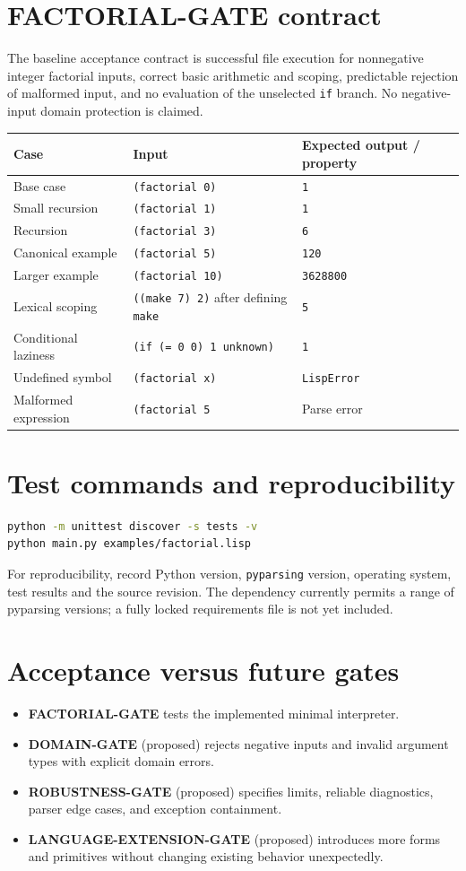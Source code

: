 \documentclass[11pt,a4paper,oneside]{report}
\begin{document}
\section{FACTORIAL-GATE contract}
The baseline acceptance contract is successful file execution for nonnegative integer factorial inputs, correct basic arithmetic and scoping, predictable rejection of malformed input, and no evaluation of the unselected \texttt{if} branch. No negative-input domain protection is claimed.
\begin{longtable}{p{}p{}p{}}\toprule Case & Input & Expected output / property\\\midrule\endhead
Base case & \texttt{(factorial 0)} & \texttt{1}\\
Small recursion & \texttt{(factorial 1)} & \texttt{1}\\
Recursion & \texttt{(factorial 3)} & \texttt{6}\\
Canonical example & \texttt{(factorial 5)} & \texttt{120}\\
Larger example & \texttt{(factorial 10)} & \texttt{3628800}\\
Lexical scoping & \texttt{((make 7) 2)} after defining \texttt{make} & \texttt{5}\\
Conditional laziness & \texttt{(if (= 0 0) 1 unknown)} & \texttt{1}\\
Undefined symbol & \texttt{(factorial x)} & \texttt{LispError}\\
Malformed expression & \texttt{(factorial 5} & Parse error\\\bottomrule
\end{longtable}
\section{Test commands and reproducibility}
\begin{lstlisting}[language=bash]
python -m unittest discover -s tests -v
python main.py examples/factorial.lisp
\end{lstlisting}
For reproducibility, record Python version, \texttt{pyparsing} version, operating system, test results and the source revision. The dependency currently permits a range of pyparsing versions; a fully locked requirements file is not yet included.
\section{Acceptance versus future gates}
\begin{itemize}[leftmargin=*]
\item \textbf{FACTORIAL-GATE} tests the implemented minimal interpreter.
\item \textbf{DOMAIN-GATE} (proposed) rejects negative inputs and invalid argument types with explicit domain errors.
\item \textbf{ROBUSTNESS-GATE} (proposed) specifies limits, reliable diagnostics, parser edge cases, and exception containment.
\item \textbf{LANGUAGE-EXTENSION-GATE} (proposed) introduces more forms and primitives without changing existing behavior unexpectedly.
\end{itemize}
\end{document}
